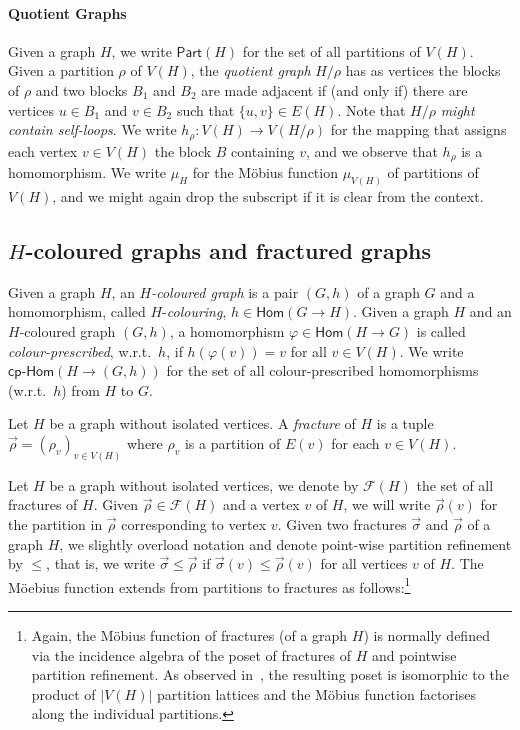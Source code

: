 \documentclass[authorcolumns,numberwithinsect]{no-lipics-v2022}
\newcommand{\homs}[2]{\mathsf{Hom}(#1 \to #2)}
\newcommand{\ppart}{\ensuremath{\mathsf{Part}}}
\newcommand{\cphoms}{\mathsf{cp}\text{-}\mathsf{Hom}}
\begin{document}
\paragraph*{Quotient Graphs}
Given a graph $H$, we write $\ppart(H)$ for the set of all partitions of $V(H)$. Given a partition $\rho$ of $V(H)$, the \emph{quotient graph} $H/\rho$ has as vertices the blocks of $\rho$ and two blocks $B_1$ and $B_2$ are made adjacent if (and only if) there are vertices $u\in B_1$ and $v\in B_2$ such that $\{u,v\} \in E(H)$. Note that $H/\rho$ \emph{might contain self-loops}. We write $h_\rho: V(H) \to V(H/\rho)$ for the mapping that assigns each vertex $v\in V(H)$ the block $B$ containing $v$, and we observe that $h_\rho$ is a homomorphism. We write $\mu_H$ for the M\"obius function $\mu_{V(H)}$ of partitions of $V(H)$, and we might again drop the subscript if it is clear from the context. 

\subsection{$H$-coloured graphs and fractured graphs}\label{sec:col_graphs_fractures}



Given a graph $H$, an $H$\emph{-coloured graph} is a pair $(G,h)$ of a graph $G$ and a homomorphism, called $H$-\emph{colouring}, $h\in \homs{G}{H}$.
Given a graph $H$ and an $H$-coloured graph $(G,h)$, a homomorphism $\varphi \in \homs{H}{G}$ is called \emph{colour-prescribed}, w.r.t.\ $h$, if $h(\varphi(v))=v$ for all $v\in V(H)$. We write $\cphoms(H \to (G,h))$ for the set of all colour-prescribed homomorphisms (w.r.t.\ $h$) from $H$ to $G$.

\begin{definition}[Fracture]\label{def:fracture}
    Let $H$ be a graph without isolated vertices. A \emph{fracture} of $H$ is a tuple $\vec\rho=(\rho_v)_{v\in V(H)}$ where $\rho_v$ is a partition of $E(v)$ for each $v\in V(H)$.
\end{definition}


Let $H$ be a graph without isolated vertices, we denote by $\mathcal{F}(H)$ the set of all fractures of $H$. Given $\vec{\rho}\in\mathcal{F}(H)$ and a vertex $v$ of $H$, we will write $\vec{\rho}(v)$ for the partition in $\vec{\rho}$ corresponding to vertex $v$. Given two fractures $\vec{\sigma}$ and $\vec{\rho}$ of a graph $H$, we slightly overload notation and denote point-wise partition refinement by $\leq$, that is, we write $\vec{\sigma}\leq \vec{\rho}$ if $\vec{\sigma}(v) \leq \vec{\rho}(v)$ for all vertices $v$ of $H$. The M\"oebius function extends from partitions to fractures as follows:\footnote{Again, the M\"obius function of fractures (of a graph $H$) is normally defined via the incidence algebra of the poset of fractures of $H$ and pointwise partition refinement. As observed in~\cite{PeyerimhoffRSSVW23}, the resulting poset is isomorphic to the product of $|V(H)|$ partition lattices and the M\"obius function factorises along the individual partitions.}
\end{document}
